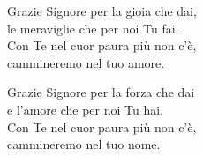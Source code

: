 
 

\spazio

\strofa Grazie Signore per la gioia che dai,\\
le meraviglie che per noi Tu fai.\\
Con Te nel cuor paura più non c'è,\\
cammineremo nel tuo amore.

\spazio


\spazio

\strofa Grazie Signore per la forza che dai\\
e l'amore che per noi Tu hai.\\
Con Te nel cuor paura più non c'è,\\
cammineremo nel tuo nome.

\spazio

